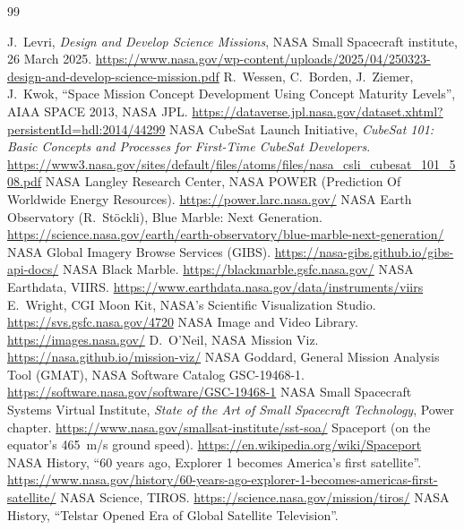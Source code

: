 \documentclass[11pt,a4paper]{article}
\begin{document}
\begin{thebibliography}{99}\small

 J.~Levri, \emph{Design and Develop Science Missions}, NASA Small Spacecraft institute, 26 March 2025.
  \url{https://www.nasa.gov/wp-content/uploads/2025/04/250323-design-and-develop-science-mission.pdf}
 R.~Wessen, C.~Borden, J.~Ziemer, J.~Kwok, ``Space Mission Concept Development Using Concept Maturity Levels'', AIAA SPACE 2013, NASA JPL.
  \url{https://dataverse.jpl.nasa.gov/dataset.xhtml?persistentId=hdl:2014/44299}
 NASA CubeSat Launch Initiative, \emph{CubeSat 101: Basic Concepts and Processes for First-Time CubeSat Developers}.
  \url{https://www3.nasa.gov/sites/default/files/atoms/files/nasa_csli_cubesat_101_508.pdf}
 NASA Langley Research Center, NASA POWER (Prediction Of Worldwide Energy Resources). \url{https://power.larc.nasa.gov/}
 NASA Earth Observatory (R.~St\"ockli), Blue Marble: Next Generation.
  \url{https://science.nasa.gov/earth/earth-observatory/blue-marble-next-generation/}
 NASA Global Imagery Browse Services (GIBS). \url{https://nasa-gibs.github.io/gibs-api-docs/}
 NASA Black Marble. \url{https://blackmarble.gsfc.nasa.gov/}
 NASA Earthdata, VIIRS. \url{https://www.earthdata.nasa.gov/data/instruments/viirs}
 E.~Wright, CGI Moon Kit, NASA's Scientific Visualization Studio. \url{https://svs.gsfc.nasa.gov/4720}
 NASA Image and Video Library. \url{https://images.nasa.gov/}
 D.~O'Neil, NASA Mission Viz. \url{https://nasa.github.io/mission-viz/}
 NASA Goddard, General Mission Analysis Tool (GMAT), NASA Software Catalog GSC-19468-1.
  \url{https://software.nasa.gov/software/GSC-19468-1}
 NASA Small Spacecraft Systems Virtual Institute, \emph{State of the Art of Small Spacecraft Technology}, Power chapter.
  \url{https://www.nasa.gov/smallsat-institute/sst-soa/}
 Spaceport (on the equator's 465~m/s ground speed). \url{https://en.wikipedia.org/wiki/Spaceport}
 NASA History, ``60 years ago, Explorer 1 becomes America's first satellite''.
  \url{https://www.nasa.gov/history/60-years-ago-explorer-1-becomes-americas-first-satellite/}
 NASA Science, TIROS. \url{https://science.nasa.gov/mission/tiros/}
 NASA History, ``Telstar Opened Era of Global Satellite Television''.

\end{thebibliography}
\end{document}
